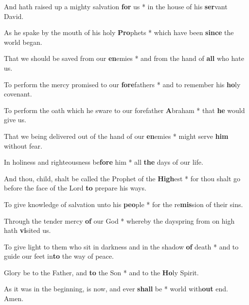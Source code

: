 \begin{multicols}{2}
	And hath raised up a mighty salvation \textbf{for} us * in the house of his \textbf{ser}vant David.
	
	As he spake by the mouth of his holy \textbf{Pro}phets * which have been \textbf{since} the world began.
	
	That we should be saved from our \textbf{en}emies * and from the hand of \textbf{all} who hate us.
	
	To perform the mercy promised to our \textbf{fore}fathers * and to remember his \textbf{ho}ly covenant.
	
	To perform the oath which he sware to our forefather \textbf{A}braham *  that \textbf{he} would give us.
	
	That we being delivered out of the hand of our \textbf{en}emies * might serve \textbf{him} without fear.
	
	In holiness and righteousness be\textbf{fore} him * all \textbf{the} days of our life.
	
	And thou, child, shalt be called the Prophet of the \textbf{High}est * for thou shalt go before the face of the Lord \textbf{to} prepare his ways.
	
	To give knowledge of salvation unto his \textbf{peo}ple * for the re\textbf{mis}sion of their sins.
	
	Through the tender mercy \textbf{of} our God * whereby the dayspring from on high hath \textbf{vi}sited us.
	
	To give light to them who sit in darkness and in the shadow \textbf{of} death * and to guide our feet in\textbf{to} the way of peace.
	
	Glory be to the Father, and \textbf{to} the Son * and to the \textbf{Ho}ly Spirit.
	
	As it was in the beginning, is now, and ever \textbf{shall} be * world with\textbf{out} end. Amen.
\end{multicols}